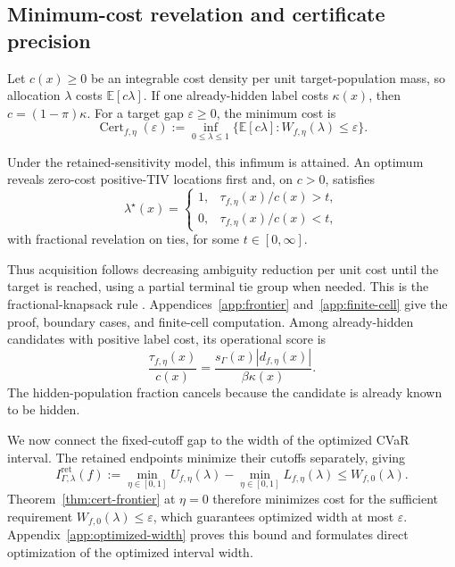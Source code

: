 \subsection{Minimum-cost revelation and certificate precision}
\label{sec:frontier}
Let \(c(x)\ge0\) be an integrable cost density per unit target-population mass, so allocation \(\lambda\) costs \(\mathbb E[c\lambda]\). If one already-hidden label costs \(\kappa(x)\), then \(c=(1-\pi)\kappa\). For a target gap \(\varepsilon\ge0\), the minimum cost is
\begin{equation}
 \operatorname{Cert}_{f,\eta}(\varepsilon)
 :=\inf_{0\le\lambda\le1}
 \{\mathbb E[c\lambda]:W_{f,\eta}(\lambda)\le\varepsilon\}.
\label{eq:cert-frontier}
\end{equation}

\begin{theorem}
\label{thm:cert-frontier}
Under the retained-sensitivity model, this infimum is attained. An optimum reveals zero-cost positive-TIV locations first and, on \(c>0\), satisfies
\[
 \lambda^\star(x)=
 \begin{cases}
 1,&\tau_{f,\eta}(x)/c(x)>t,\\
 0,&\tau_{f,\eta}(x)/c(x)<t,
 \end{cases}
\]
with fractional revelation on ties, for some \(t\in[0,\infty]\).
\end{theorem}

Thus acquisition follows decreasing ambiguity reduction per unit cost until the target is reached, using a partial terminal tie group when needed. This is the fractional-knapsack rule \citep{dantzig1957discrete}. Appendices~\ref{app:frontier} and~\ref{app:finite-cell} give the proof, boundary cases, and finite-cell computation. Among already-hidden candidates with positive label cost, its operational score is
\[
 \frac{\tau_{f,\eta}(x)}{c(x)}
 =\frac{s_\Gamma(x)|d_{f,\eta}(x)|}{\beta\kappa(x)}.
\]
The hidden-population fraction cancels because the candidate is already known to be hidden.

\label{sec:sequential}
We now connect the fixed-cutoff gap to the width of the optimized CVaR interval. The retained endpoints minimize their cutoffs separately, giving
\begin{equation}
 I^{\mathrm{ret}}_{\Gamma,\lambda}(f)
 :=\min_{\eta\in[0,1]}U_{f,\eta}(\lambda)
   -\min_{\eta\in[0,1]}L_{f,\eta}(\lambda)
 \le W_{f,0}(\lambda).
\label{prop:uniform-threshold}
\end{equation}
Theorem~\ref{thm:cert-frontier} at \(\eta=0\) therefore minimizes cost for the sufficient requirement \(W_{f,0}(\lambda)\le\varepsilon\), which guarantees optimized width at most \(\varepsilon\). Appendix~\ref{app:optimized-width} proves this bound and formulates direct optimization of the optimized interval width.

